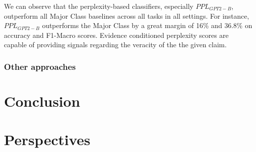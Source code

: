 \documentclass[10pt, english]{report}
\begin{document}
We can observe that the perplexity-based classifiers, especially $PPL_{GPT2-B}$, outperform all Major Class baselines across all
tasks in all settings. For instance, $PPL_{GPT2-B}$ outperforms the Major Class by a great margin of
16\% and 36.8\% on accuracy and F1-Macro scores. Evidence conditioned perplexity scores are capable of providing signals regarding the veracity of the the given claim.

\subsection{Other approaches}




\chapter{Conclusion}


\chapter{Perspectives}




\end{document}

